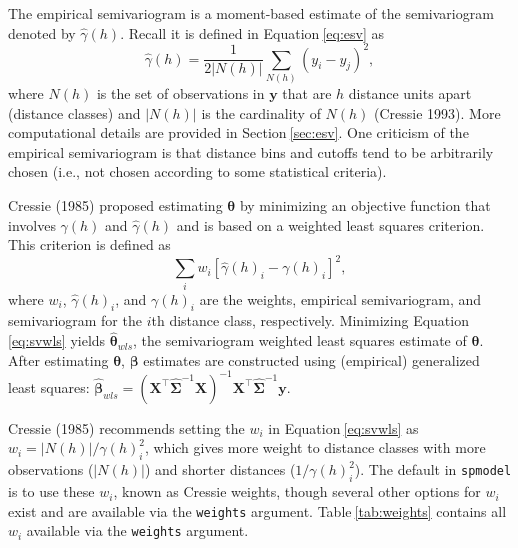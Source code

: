 \documentclass{article}
\begin{document}
The empirical semivariogram is a moment-based estimate of the
semivariogram denoted by \(\hat{\gamma}(h)\). Recall it is defined in
Equation\(~\)\ref{eq:esv} as \begin{equation*}
  \hat{\gamma}(h) = \frac{1}{2|N(h)|} \sum_{N(h)} (y_i - y_j)^2, 
\end{equation*} where \(N(h)\) is the set of observations in
\(\mathbf{y}\) that are \(h\) distance units apart (distance classes)
and \(|N(h)|\) is the cardinality of \(N(h)\) (Cressie 1993). More
computational details are provided in Section\(~\)\ref{sec:esv}. One
criticism of the empirical semivariogram is that distance bins and
cutoffs tend to be arbitrarily chosen (i.e., not chosen according to
some statistical criteria).

Cressie (1985) proposed estimating \(\boldsymbol{\theta}\) by minimizing
an objective function that involves \(\gamma(h)\) and
\(\hat{\gamma}(h)\) and is based on a weighted least squares criterion.
This criterion is defined as \begin{equation}\label{eq:svwls}
  \sum_i w_i [\hat{\gamma}(h)_i - \gamma(h)_i]^2,
\end{equation} where \(w_i\), \(\hat{\gamma}(h)_i\), and \(\gamma(h)_i\)
are the weights, empirical semivariogram, and semivariogram for the
\(i\)th distance class, respectively. Minimizing
Equation\(~\)\ref{eq:svwls} yields \(\boldsymbol{\hat{\theta}}_{wls}\),
the semivariogram weighted least squares estimate of
\(\boldsymbol{\theta}\). After estimating \(\boldsymbol{\theta}\),
\(\boldsymbol{\beta}\) estimates are constructed using (empirical)
generalized least squares:
\(\boldsymbol{\hat{\beta}}_{wls} = (\mathbf{X}^\top \hat{\mathbf{\Sigma}}^{-1} \mathbf{X})^{-1} \mathbf{X}^\top \hat{\mathbf{\Sigma}}^{-1} \mathbf{y}\).

Cressie (1985) recommends setting the \(w_i\) in
Equation\(~\)\ref{eq:svwls} as \(w_i = |N(h)| / \gamma(h)_i^2\), which
gives more weight to distance classes with more observations
(\(|N(h)|\)) and shorter distances (\(1 / \gamma(h)_i^2\)). The default
in \texttt{spmodel} is to use these \(w_i\), known as Cressie weights,
though several other options for \(w_i\) exist and are available via the
\texttt{weights} argument. Table\(~\)\ref{tab:weights} contains all
\(w_i\) available via the \texttt{weights} argument.
\end{document}
